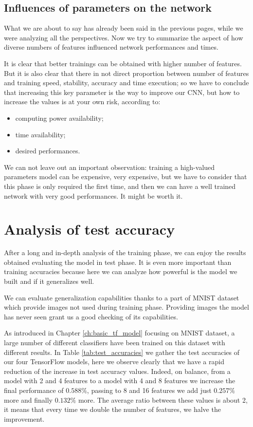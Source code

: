 \subsection{Influences of parameters on the network}

What we are about to say has already been said in the previous pages, while we were analyzing all the perspectives. Now we try to summarize the aspect of how diverse numbers of features influenced network performances and times.

It is clear that better trainings can be obtained with higher number of features. But it is also clear that there in not direct proportion between number of features and training speed, stability, accuracy and time execution; so we have to conclude that increasing this key parameter is the way to improve our \acs{CNN}, but how to increase the values is at your own risk, according to:
\begin{itemize}
	\item computing power availability;
	\item time availability;
	\item desired performances.
\end{itemize}

We can not leave out an important observation: training a high-valued parameters model can be expensive, very expensive, but we have to consider that this phase is only required the first time, and then we can have a well trained network with very good performances. It might be worth it.

\section{Analysis of test accuracy}

After a long and in-depth analysis of the training phase, we can enjoy the results obtained evaluating the model in test phase. It is even more important than training accuracies because here we can analyze how powerful is the model we built and if it generalizes well.

We can evaluate generalization capabilities thanks to a part of MNIST dataset which provide images not used during training phase. Providing images the model has never seen grant us a good checking of its capabilities.

As introduced in Chapter \ref{ch:basic_tf_model} focusing on MNIST dataset, a large number of different classifiers have been trained on this dataset with different results. In Table \ref{tab:test_accuracies} we gather the test accuracies of our four TensorFlow models, here we observe clearly that we have a rapid reduction of the increase in test accuracy values. Indeed, on balance, from a model with 2 and 4 features to a model with 4 and 8 features we increase the final performance of $0.588 \%$, passing to 8 and 16 features we add just $0.257 \%$ more and finally $0.132 \%$ more. The average ratio between these values is about 2, it means that every time we double the number of features, we halve the improvement.

